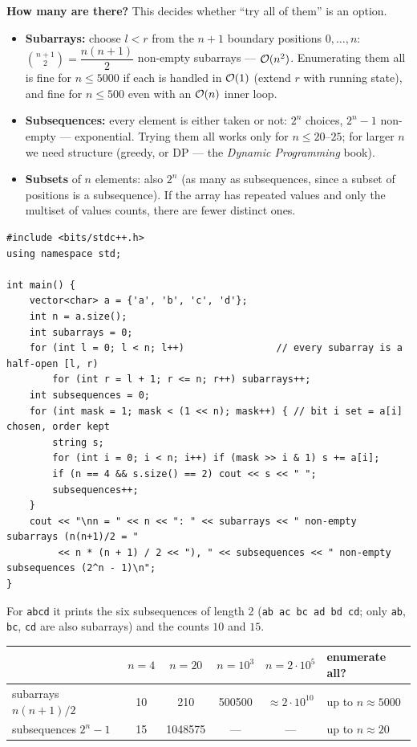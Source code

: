 \textbf{How many are there?} This decides whether ``try all of them'' is an option.
\begin{itemize}[leftmargin=*]
    \item \textbf{Subarrays:} choose $l < r$ from the $n+1$ boundary positions $0, \dots, n$: $\binom{n+1}{2} = \dfrac{n(n+1)}{2}$ non-empty subarrays --- $\mathcal{O}(n^2)$. Enumerating them all is fine for $n \le 5000$ if each is handled in $\mathcal{O}(1)$ (extend $r$ with running state), and fine for $n \le 500$ even with an $\mathcal{O}(n)$ inner loop.
    \item \textbf{Subsequences:} every element is either taken or not: $2^n$ choices, $2^n - 1$ non-empty --- exponential. Trying them all works only for $n \le 20$--$25$; for larger $n$ we need structure (greedy, or DP --- the \textit{Dynamic Programming} book).
    \item \textbf{Subsets} of $n$ elements: also $2^n$ (as many as subsequences, since a subset of positions is a subsequence). If the array has repeated values and only the multiset of values counts, there are fewer distinct ones.
\end{itemize}

\begin{lstlisting}[style=cpp]
#include <bits/stdc++.h>
using namespace std;

int main() {
    vector<char> a = {'a', 'b', 'c', 'd'};
    int n = a.size();
    int subarrays = 0;
    for (int l = 0; l < n; l++)                // every subarray is a half-open [l, r)
        for (int r = l + 1; r <= n; r++) subarrays++;
    int subsequences = 0;
    for (int mask = 1; mask < (1 << n); mask++) { // bit i set = a[i] chosen, order kept
        string s;
        for (int i = 0; i < n; i++) if (mask >> i & 1) s += a[i];
        if (n == 4 && s.size() == 2) cout << s << " ";
        subsequences++;
    }
    cout << "\nn = " << n << ": " << subarrays << " non-empty subarrays (n(n+1)/2 = "
         << n * (n + 1) / 2 << "), " << subsequences << " non-empty subsequences (2^n - 1)\n";
}
\end{lstlisting}

For \texttt{abcd} it prints the six subsequences of length 2 (\texttt{ab ac bc ad bd cd}; only \texttt{ab}, \texttt{bc}, \texttt{cd} are also subarrays) and the counts $10$ and $15$.

\begin{table}[H]
\centering\small
\renewcommand{\arraystretch}{1.2}
\begin{tabular}{@{}lccccl@{}}
\toprule
 & $n = 4$ & $n = 20$ & $n = 10^3$ & $n = 2\cdot10^5$ & enumerate all? \\
\midrule
subarrays $n(n+1)/2$ & 10 & 210 & 500500 & $\approx 2\cdot10^{10}$ & up to $n \approx 5000$ \\
subsequences $2^n - 1$ & 15 & 1048575 & --- & --- & up to $n \approx 20$ \\
\bottomrule
\end{tabular}
\end{table}

